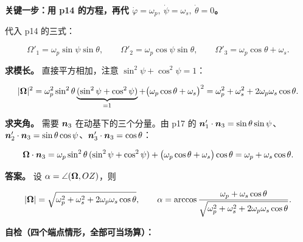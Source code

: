 \documentclass[11pt]{ctexart}
\begin{document}
\textbf{关键一步：用 p14 的方程，再代 $\dot\varphi=\omega_p,\ \dot\psi=\omega_s,\ \dot\theta=0$。}


代入 p14 的三式：

\[
\Omega'_1=\omega_p\sin\psi\sin\theta,\qquad
\Omega'_2=\omega_p\cos\psi\sin\theta,\qquad
\Omega'_3=\omega_p\cos\theta+\omega_s .
\]

\textbf{求模长。} 直接平方相加，注意 $\sin^{2}\psi+\cos^{2}\psi=1$：

\[
|\boldsymbol{\Omega}|^{2}
=\omega_p^{2}\sin^{2}\theta\underbrace{(\sin^{2}\psi+\cos^{2}\psi)}_{=1}
+\bigl(\omega_p\cos\theta+\omega_s\bigr)^{2}
=\omega_p^{2}+\omega_s^{2}+2\omega_p\omega_s\cos\theta .
\]

\textbf{求夹角。} 需要 $\boldsymbol{n}_3$ 在动基下的三个分量。由 p17 的
$\boldsymbol{n}'_1\cdot\boldsymbol{n}_3=\sin\theta\sin\psi$、$\boldsymbol{n}'_2\cdot\boldsymbol{n}_3=\sin\theta\cos\psi$、$\boldsymbol{n}'_3\cdot\boldsymbol{n}_3=\cos\theta$：

\[
\boldsymbol{\Omega}\cdot\boldsymbol{n}_3
=\omega_p\sin^{2}\theta\,(\sin^{2}\psi+\cos^{2}\psi)+\bigl(\omega_p\cos\theta+\omega_s\bigr)\cos\theta
=\omega_p+\omega_s\cos\theta .
\]


\textbf{答案。} 设 $\alpha=\angle(\boldsymbol{\Omega},OZ)$，则

\[
|\boldsymbol{\Omega}|=\sqrt{\omega_p^{2}+\omega_s^{2}+2\omega_p\omega_s\cos\theta},
\qquad
\alpha=\arccos\frac{\omega_p+\omega_s\cos\theta}{\sqrt{\omega_p^{2}+\omega_s^{2}+2\omega_p\omega_s\cos\theta}} .
\]


\needspace{6.5cm}
\textbf{自检（四个端点情形，全部可当场算）：}
\end{document}

